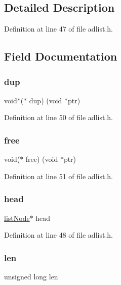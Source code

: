\subsection{Detailed Description}


Definition at line 47 of file adlist.\+h.



\subsection{Field Documentation}
\mbox{\label{structlist_acb324bb20395015fe8cb806e767ef7ad}} 
\subsubsection{\texorpdfstring{dup}{dup}}
{\footnotesize\ttfamily void$\ast$($\ast$ dup) (void $\ast$ptr)}



Definition at line 50 of file adlist.\+h.

\mbox{\label{structlist_a7ffa51abb1dd8bc3fe4627cb1d2405c5}} 
\subsubsection{\texorpdfstring{free}{free}}
{\footnotesize\ttfamily void($\ast$ free) (void $\ast$ptr)}



Definition at line 51 of file adlist.\+h.

\mbox{\label{structlist_aeafa6e94f6b451fac36e305798d4d656}} 
\subsubsection{\texorpdfstring{head}{head}}
{\footnotesize\ttfamily \hyperlink{structlist_node}{list\+Node}$\ast$ head}



Definition at line 48 of file adlist.\+h.

\mbox{\label{structlist_af2e72f8a5bf4bcdb77566c2936d5f13d}} 
\subsubsection{\texorpdfstring{len}{len}}
{\footnotesize\ttfamily unsigned long len}



